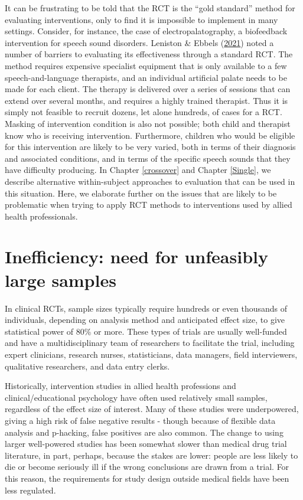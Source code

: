 \documentclass{krantz}
\begin{document}
It can be frustrating to be told that the RCT is the ``gold standard'' method for evaluating interventions, only to find it is impossible to implement in many settings. Consider, for instance, the case of electropalatography, a biofeedback intervention for speech sound disorders. Leniston \& Ebbels (\protect\hyperlink{ref-leniston2021}{2021}) noted a number of barriers to evaluating its effectiveness through a standard RCT. The method requires expensive specialist equipment that is only available to a few speech-and-language therapists, and an individual artificial palate needs to be made for each client. The therapy is delivered over a series of sessions that can extend over several months, and requires a highly trained therapist. Thus it is simply not feasible to recruit dozens, let alone hundreds, of cases for a RCT. Masking of intervention condition is also not possible; both child and therapist know who is receiving intervention. Furthermore, children who would be eligible for this intervention are likely to be very varied, both in terms of their diagnosis and associated conditions, and in terms of the specific speech sounds that they have difficulty producing. In Chapter \ref{crossover} and Chapter \ref{Single}, we describe alternative within-subject approaches to evaluation that can be used in this situation. Here, we elaborate further on the issues that are likely to be problematic when trying to apply RCT methods to interventions used by allied health professionals.

\hypertarget{inefficiency-need-for-unfeasibly-large-samples}{%
\section{Inefficiency: need for unfeasibly large samples}\label{inefficiency-need-for-unfeasibly-large-samples}}

In clinical RCTs, sample sizes typically require hundreds or even thousands of individuals, depending on analysis method and anticipated effect size, to give statistical power of 80\% or more. These types of trials are usually well-funded and have a multidisciplinary team of researchers to facilitate the trial, including expert clinicians, research nurses, statisticians, data managers, field interviewers, qualitative researchers, and data entry clerks.

Historically, intervention studies in allied health professions and clinical/educational psychology have often used relatively small samples, regardless of the effect size of interest. Many of these studies were underpowered, giving a high risk of false negative results - though because of flexible data analysis and p-hacking, false positives are also common. The change to using larger well-powered studies has been somewhat slower than medical drug trial literature, in part, perhaps, because the stakes are lower: people are less likely to die or become seriously ill if the wrong conclusions are drawn from a trial. For this reason, the requirements for study design outside medical fields have been less regulated.
\end{document}
